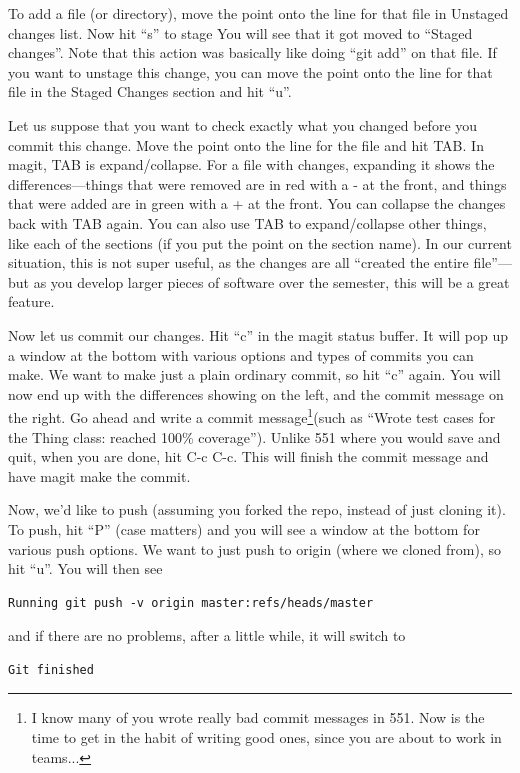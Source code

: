 \documentclass[12pt]{article}
\begin{document}
To add a file (or directory), move the point
onto the line for that file in Unstaged changes list.   Now hit ``s'' to stage
You will see that it got moved to ``Staged changes''.   Note that
this action was basically like doing ``git add'' on that file.
If you want to unstage this change, you can move the point onto the
line for that file in the Staged Changes section and hit ``u''.

Let us suppose that you want to check exactly what you changed before
you commit this change.  Move the point onto the line for the file and
hit TAB.  In magit, TAB is expand/collapse.  For a file with changes,
expanding it shows the differences---things that were removed are in
red with a - at the front, and things that were added are in green
with a + at the front.  You can collapse the changes back with TAB
again.  You can also use TAB to expand/collapse other things, like
each of the sections (if you put the point on the section name).
In our current situation, this is not super useful, as the changes
are all ``created the entire file''---but as you develop larger
pieces of software over the semester, this will be a great feature.

Now let us commit our changes.  Hit ``c'' in the magit status buffer.
It will pop up a window at the bottom with various options and types
of commits you can make.  We want to make just a plain ordinary
commit, so hit ``c'' again.  You will now end up with the differences
showing on the left, and the commit message on the right.  Go ahead
and write a commit message\footnote{I know many of you wrote really
  bad commit messages in 551.  Now is the time to get in the habit of
  writing good ones, since you are about to work in teams...}(such as
``Wrote test cases for the Thing class: reached 100\% coverage'').
Unlike 551 where you would save and quit, when you are done, hit C-c
C-c.  This will finish the commit message and have magit make the
commit.

Now, we'd like to push (assuming you forked the repo, instead of just
cloning it).  To push, hit ``P'' (case matters) and you will see a
window at the bottom for various push options.  We want to just push
to origin (where we cloned from), so hit ``u''.  You will then see
\begin{verbatim}
Running git push -v origin master:refs/heads/master
\end{verbatim}
and if there are no problems, after a little while, it will switch to
\begin{verbatim}
Git finished
\end{verbatim}
\end{document}
